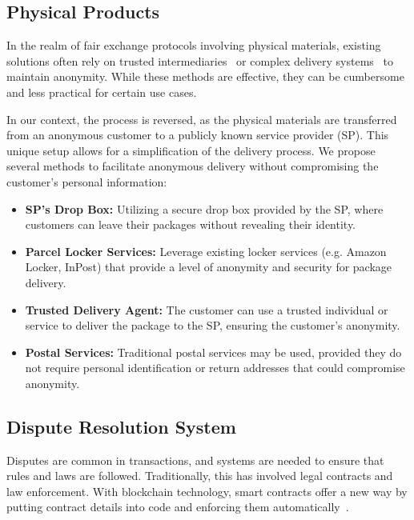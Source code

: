 \documentclass[pdftex,twocolumn,epjc3]{svjour3}
\begin{document}
\subsection{Physical Products}\label{sec:physical-products}
In the realm of fair exchange protocols involving physical materials, existing solutions often rely on trusted intermediaries~\cite{mohammedalarajFairnessPhysicalProducts2012, birjoveanuAnonymityFairexchangeEcommerce2015} or complex delivery systems~\cite{altawyLelantosBlockchainBasedAnonymous2017} to maintain anonymity. While these methods are effective, they can be cumbersome and less practical for certain use cases.

In our context, the process is reversed, as the physical materials are transferred from an anonymous customer to a publicly known service provider (SP). This unique setup allows for a simplification of the delivery process. We propose several methods to facilitate anonymous delivery without compromising the customer's personal information:

\begin{itemize}
    \item \textbf{SP's Drop Box:} Utilizing a secure drop box provided by the SP, where customers can leave their packages without revealing their identity.
    
    \item \textbf{Parcel Locker Services:} Leverage existing locker services (e.g. Amazon Locker, InPost) that provide a level of anonymity and security for package delivery.
    
    \item \textbf{Trusted Delivery Agent:} The customer can use a trusted individual or service to deliver the package to the SP, ensuring the customer's anonymity.
    
    \item \textbf{Postal Services:} Traditional postal services may be used, provided they do not require personal identification or return addresses that could compromise anonymity.
\end{itemize}

\subsection{Dispute Resolution System}
\label{sec:dispute-resolution}
\begin{sloppypar}
Disputes are common in transactions, and systems are needed to ensure that rules and laws are followed. Traditionally, this has involved legal contracts and law enforcement. With blockchain technology, smart contracts offer a new way by putting contract details into code and enforcing them automatically~\cite{allenGovernanceBlockchainDispute2019}.
\end{sloppypar}
\end{document}
